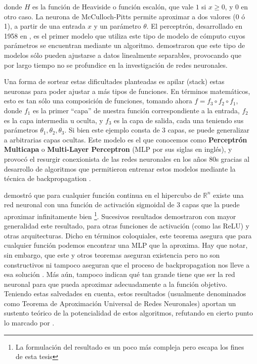 \noindent donde $H$ es la función de Heaviside o función escalón, que vale $1$ si $x \geq 0$, y $0$ en otro caso. La neurona de McCulloch-Pitts permite aproximar a dos valores (0 ó 1), a partir de una entrada $x$ y un parámetro $\theta$. El perceptrón, desarrollado en 1958 en \citet{rosenblatt1958perceptron}, es el primer modelo que utiliza este tipo de modelo de cómputo cuyos parámetros se encuentran mediante un algoritmo. \citet{minsky1969perceptrons} demostraron que este tipo de modelos sólo pueden ajustarse a datos linealmente separables, provocando que por largo tiempo no se profundice en la investigación de redes neuronales.

Una forma de sortear estas dificultades planteadas es apilar (stack) estas neuronas para poder ajustar a más tipos de funciones. En términos matemáticos, esto es tan sólo una composición de funciones, tomando ahora $f = f_3 \circ f_2 \circ f_1$, donde $f_1$ es la primer ``capa'' de nuestra función correspondiente a la entrada, $f_2$ es la capa intermedia u oculta, y $f_3$ es la capa de salida, cada una teniendo sus parámetros $\theta_1, \theta_2, \theta_3$. Si bien este ejemplo consta de 3 capas, se puede generalizar a arbitrarias capas ocultas. Este modelo es el que conocemos como \textbf{Perceptrón Multicapa} o \textbf{Multi-Layer Perceptron} (MLP por sus siglas en inglés), y provocó el resurgir conexionista de las redes neuronales en los años 80s gracias al desarrollo de algoritmos que permitieron entrenar estos modelos mediante la técnica de backpropagation \cite{rumelhart1986learning}.

\citet{cybenko1989approximation} demostró que para cualquier función continua en el hipercubo de $\mathbb{R}^n$ existe una red neuronal con una función de activación sigmoidal de 3 capas que la puede aproximar infinitamente bien \footnote{La formulación del resultado es un poco más compleja pero escapa los fines de esta tesis}. Sucesivos resultados demostraron con mayor generalidad este resultado, para otras funciones de activación (como las ReLU) y otras arquitecturas. Dicho en términos coloquiales, este teorema asegura que para cualquier función podemos encontrar una MLP que la aproxima. Hay que notar, sin embargo, que este y otros teoremas aseguran existencia pero no son constructivos ni tampoco aseguran que el proceso de backpropagation nos lleve a esa solución \cite{goodfellow2016deep}. Más aún, tampoco indican qué tan grande tiene que ser la red neuronal para que pueda aproximar adecuadamente a la función objetivo. Teniendo estas salvedades en cuenta, estos resultados (usualmente denominados como Teorema de Aproximación Universal de Redes Neuronales) aportan un sustento teórico de la potencialidad de estos algoritmos, refutando en cierto punto lo marcado por \citet{minsky1969perceptrons}.

